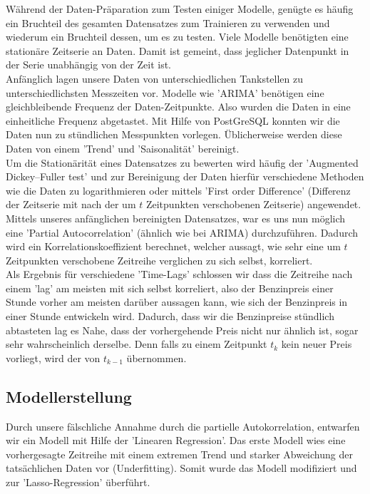 \documentclass[
ngerman          %
,a4paper          %
,11pt
,pdftex
]{report}
\begin{document}
Während der Daten-Präparation zum Testen einiger Modelle, genügte es häufig ein Bruchteil des gesamten Datensatzes zum Trainieren zu verwenden und wiederum ein Bruchteil dessen, um es zu testen.
Viele Modelle benötigten eine stationäre Zeitserie an Daten.
Damit ist gemeint, dass jeglicher Datenpunkt in der Serie unabhängig von der Zeit ist.\\
Anfänglich lagen unsere Daten von unterschiedlichen Tankstellen zu unterschiedlichsten Messzeiten vor. Modelle wie 'ARIMA' benötigen eine gleichbleibende Frequenz der Daten-Zeitpunkte. Also wurden die Daten in eine einheitliche Frequenz abgetastet. Mit Hilfe von PostGreSQL konnten wir die Daten nun zu stündlichen Messpunkten vorlegen. 
Üblicherweise werden diese Daten von einem 'Trend' und 'Saisonalität' bereinigt.\\
Um die Stationärität eines Datensatzes zu bewerten wird häufig der 'Augmented Dickey–Fuller test' \cite{stationarity} und zur Bereinigung der Daten hierfür verschiedene Methoden wie die Daten zu logarithmieren oder mittels 'First order Difference' (Differenz der Zeitserie mit nach der um $t$ Zeitpunkten verschobenen Zeitserie) angewendet. 
Mittels unseres anfänglichen bereinigten Datensatzes, war es uns nun möglich eine 'Partial Autocorrelation'\cite{pacf} (ähnlich wie bei ARIMA) durchzuführen. Dadurch wird ein Korrelationskoeffizient berechnet, welcher aussagt, wie sehr eine um $t$ Zeitpunkten verschobene Zeitreihe verglichen zu sich selbst, korreliert.\\
Als Ergebnis für verschiedene 'Time-Lags' schlossen wir dass die Zeitreihe nach einem 'lag' am meisten mit sich selbst korreliert, also der Benzinpreis einer Stunde vorher am meisten darüber aussagen kann, wie sich der Benzinpreis in einer Stunde entwickeln wird.
Dadurch, dass wir die Benzinpreise stündlich abtasteten lag es Nahe, dass der vorhergehende Preis nicht nur ähnlich ist, sogar sehr wahrscheinlich derselbe. Denn falls zu einem Zeitpunkt $t_k$ kein neuer Preis vorliegt, wird der von $t_{k-1}$ übernommen.

\subsection{Modellerstellung}

Durch unsere fälschliche Annahme durch die partielle Autokorrelation, entwarfen wir ein Modell mit Hilfe der 'Linearen Regression'.
Das erste Modell wies eine vorhergesagte Zeitreihe mit einem extremen Trend und starker Abweichung der tatsächlichen Daten vor (Underfitting). Somit wurde das Modell modifiziert und zur 'Lasso-Regression' überführt.
\end{document}
